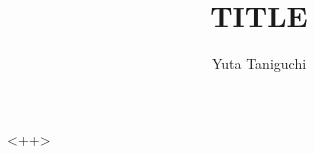 \documentclass[a4paper]{article}
\title{TITLE}
\author{Yuta Taniguchi}
\begin{document}
\maketitle


<++>
\end{document}
